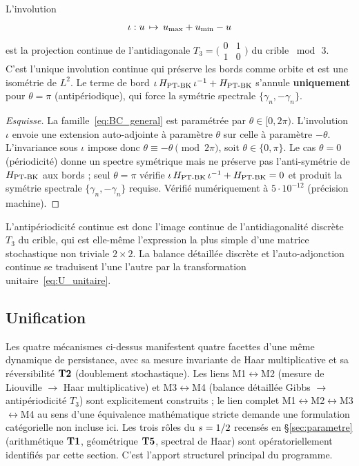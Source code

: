 \begin{proposition}[Sélection PT-canonique : antipériodicité $\theta = \pi$]
\label{prop:antiperiodicite}
L'involution
\[
\iota : u \,\mapsto\, u_{\max} + u_{\min} - u
\]
est la projection continue de l'antidiagonale
$T_3 = \bigl(\begin{smallmatrix}0 & 1\\ 1 & 0\end{smallmatrix}\bigr)$ du
crible $\bmod\,3$. C'est l'unique involution continue qui préserve les
bords comme orbite et est une isométrie de $L^{2}$. Le terme de bord
$\iota\,H_{\mathrm{PT\text{-}BK}}\,\iota^{-1} + H_{\mathrm{PT\text{-}BK}}$ s'annule \textbf{uniquement} pour
$\theta = \pi$ (antipériodique), qui force la symétrie spectrale
$\{\gamma_n, -\gamma_n\}$.
\end{proposition}

\begin{proof}[Esquisse]
La famille~\eqref{eq:BC_general} est paramétrée par
$\theta \in [0, 2\pi)$. L'involution $\iota$ envoie une extension
auto-adjointe à paramètre $\theta$ sur celle à paramètre $-\theta$.
L'invariance sous $\iota$ impose donc $\theta \equiv -\theta \pmod{2\pi}$,
soit $\theta \in \{0, \pi\}$. Le cas $\theta = 0$ (périodicité) donne un
spectre symétrique mais ne préserve pas l'anti-symétrie de $H_{\mathrm{PT\text{-}BK}}$ aux
bords ; seul $\theta = \pi$ vérifie
$\iota\,H_{\mathrm{PT\text{-}BK}}\,\iota^{-1} + H_{\mathrm{PT\text{-}BK}} = 0$ et produit la symétrie spectrale
$\{\gamma_n, -\gamma_n\}$ requise. Vérifié numériquement à
$5 \cdot 10^{-12}$ (précision machine).
\end{proof}

L'antipériodicité continue est donc l'image continue de
l'antidiagonalité discrète $T_3$ du crible, qui est elle-même
l'expression la plus simple d'une matrice stochastique non triviale
$2 \times 2$. La balance détaillée discrète et l'auto-adjonction
continue se traduisent l'une l'autre par la transformation
unitaire~\eqref{eq:U_unitaire}.

\subsection{Unification}
\label{sec:localisation_unification}

Les quatre mécanismes ci-dessus manifestent quatre facettes d'une même
dynamique de persistance, avec sa mesure invariante de Haar multiplicative
et sa réversibilité $\textbf{T2}$ (doublement stochastique). Les liens
M1$\leftrightarrow$M2 (mesure de Liouville $\to$ Haar multiplicative) et
M3$\leftrightarrow$M4 (balance détaillée Gibbs $\to$ antipériodicité
$T_3$) sont explicitement construits ; le lien complet
M1$\leftrightarrow$M2$\leftrightarrow$M3$\leftrightarrow$M4 au sens
d'une équivalence mathématique stricte demande une formulation
catégorielle non incluse ici. Les trois rôles du $s = 1/2$ recensés
en \S\ref{sec:parametre} (arithmétique $\textbf{T1}$, géométrique $\textbf{T5}$,
spectral de Haar) sont opératoriellement identifiés par cette section.
C'est l'apport structurel principal du programme.

